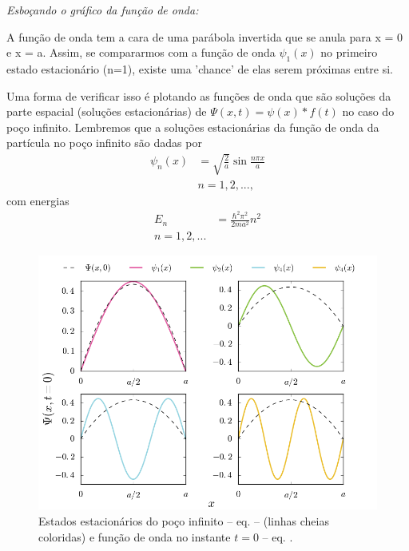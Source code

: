 \documentclass[red]{mecanica_quantica}
\begin{document}
		
	\emph{Esboçando o gráfico da função de onda:}
	
A função de onda tem a cara de uma parábola invertida que se anula para x = 0 e x = a. Assim, se compararmos com a função de onda $\psi_1(x)$ no primeiro estado estacionário (n=1), existe uma 'chance' de elas serem próximas entre si. 

\begin{minipage}{\linewidth}
      \centering
      \begin{minipage}{0.325\linewidth}
Uma forma de verificar isso é plotando as funções de onda que são soluções da parte espacial (soluções estacionárias) de $\Psi(x,t) = \psi(x) * f(t)$ no caso do poço infinito.
	Lembremos que a soluções estacionárias da função de onda da partícula no poço infinito são dadas por
		\begin{align}
		\label{eq:Psipoco}
			\psi_n(x) & = \sqrt{\frac{2}{a}} \sin{\frac{n\pi x}{a}}  \nonumber \\ 
			& n = 1, 2, ...,
		\end{align}
		com energias
		\begin{align}
		\label{eq:energiapoco}
			E_n & = \frac{\hbar^2 \pi^2}{2m a^2} n^2 \nonumber \\
			n = 1, 2, ...
		\end{align}
	


      \end{minipage}
      \hspace{0.05\linewidth}
      \begin{minipage}{0.6\linewidth}
 
       	\begin{figure}[H]
	\begin{center}
		\includegraphics[scale=0.5]{figs/2lista_prob7}
		\caption{Estados estacionários do poço infinito -- eq.   -- (linhas cheias coloridas) e função de onda no instante $t=0$ -- eq. . }
		\label{fig:funcaodeonda}
	\end{center}
	\end{figure}    


      \end{minipage}
  \end{minipage}
\end{document}
